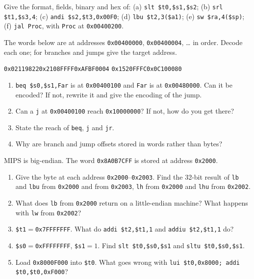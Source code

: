 \begin{exercise}\label{q:isa-enc}
Give the format, fields, binary and hex of:
(a) \texttt{slt \$t0,\$s1,\$s2};
(b) \texttt{srl \$t1,\$s3,4};
(c) \texttt{andi \$s2,\$t3,0x00F0};
(d) \texttt{lbu \$t2,3(\$a1)};
(e) \texttt{sw \$ra,4(\$sp)};
(f) \texttt{jal Proc}, with \texttt{Proc} at \texttt{0x00400200}.
\end{exercise}

\begin{exercise}\label{q:isa-dec}
The words below are at addresses \texttt{0x00400000}, \texttt{0x00400004},
\dots{} in order. Decode each one; for branches and jumps give the target
address.
\begin{center}
\texttt{0x02119822}\quad \texttt{0x2108FFFF}\quad \texttt{0xAFBF0004}\quad
\texttt{0x1520FFFC}\quad \texttt{0x0C100080}
\end{center}
\end{exercise}

\begin{exercise}\label{q:isa-range}
\leavevmode
\begin{enumerate}[label=(\alph*),leftmargin=*]
  \item \texttt{beq \$s0,\$s1,Far} is at \texttt{0x00400100} and \texttt{Far}
  is at \texttt{0x00480000}. Can it be encoded? If not, rewrite it and give the
  encoding of the jump.
  \item Can a \texttt{j} at \texttt{0x00400100} reach \texttt{0x10000000}? If
  not, how do you get there?
  \item State the reach of \texttt{beq}, \texttt{j} and \texttt{jr}.
  \item Why are branch and jump offsets stored in words rather than bytes?
\end{enumerate}
\end{exercise}

\begin{exercise}\label{q:isa-sign}
MIPS is big-endian. The word \texttt{0x8A0B7CFF} is stored at address
\texttt{0x2000}.
\begin{enumerate}[label=(\alph*),leftmargin=*]
  \item Give the byte at each address \texttt{0x2000}--\texttt{0x2003}. Find
  the 32-bit result of \texttt{lb} and \texttt{lbu} from \texttt{0x2000} and
  from \texttt{0x2003}, \texttt{lh} from \texttt{0x2000} and \texttt{lhu} from
  \texttt{0x2002}.
  \item What does \texttt{lb} from \texttt{0x2000} return on a little-endian
  machine? What happens with \texttt{lw} from \texttt{0x2002}?
  \item \texttt{\$t1}$=$\texttt{0x7FFFFFFF}. What do \texttt{addi \$t2,\$t1,1}
  and \texttt{addiu \$t2,\$t1,1} do?
  \item \texttt{\$s0}$=$\texttt{0xFFFFFFFF}, \texttt{\$s1}$=1$. Find
  \texttt{slt \$t0,\$s0,\$s1} and \texttt{sltu \$t0,\$s0,\$s1}.
  \item Load \texttt{0x8000F000} into \texttt{\$t0}. What goes wrong with
  \texttt{lui \$t0,0x8000; addi \$t0,\$t0,0xF000}?
\end{enumerate}
\end{exercise}

